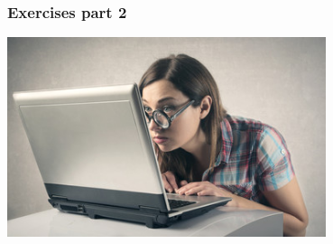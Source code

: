 \documentclass[compress]{beamer}
\begin{document}
\begin{frame}
\frametitle{Exercises part 2}   
\begin{center}
 \includegraphics[width=0.7\textwidth]{figures/girlnerd.jpg}\\
\end{center}
\end{frame}




% 
% 
% 
%  
% 
% 





\section{}
\end{document}

